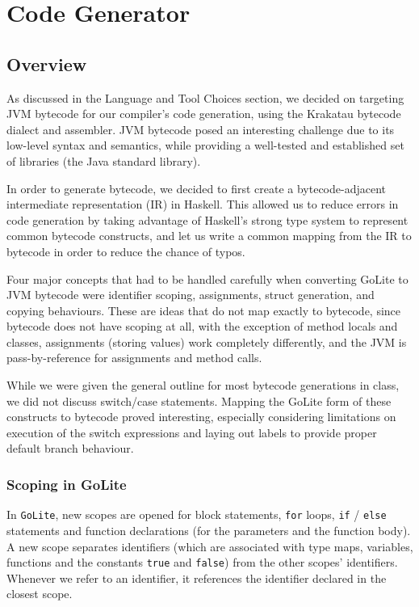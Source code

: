 \documentclass[11pt]{article}
\begin{document}
\section{Code Generator}
\subsection{Overview}

As discussed in the Language and Tool Choices section, we decided on targeting
JVM bytecode for our compiler's code generation, using the Krakatau bytecode
dialect and assembler. JVM bytecode posed an interesting challenge due to its
low-level syntax and semantics, while providing a well-tested and established
set of libraries (the Java standard library).

In order to generate bytecode, we decided to first create a bytecode-adjacent
intermediate representation (IR) in Haskell. This allowed us to reduce errors
in code generation by taking advantage of Haskell's strong type system to
represent common bytecode constructs, and let us write a common mapping from
the IR to bytecode in order to reduce the chance of typos.

Four major concepts that had to be handled carefully when converting GoLite to
JVM bytecode were identifier scoping, assignments, struct generation, and copying
behaviours. These are ideas that do not map exactly to bytecode, since bytecode
does not have scoping at all, with the exception of method locals and classes,
assignments (storing values) work completely differently, and the JVM is
pass-by-reference for assignments and method calls.

While we were given the general outline for most bytecode generations in class, we
did not discuss switch/case statements. Mapping the GoLite form of these constructs
to bytecode proved interesting, especially considering limitations on execution of
the switch expressions and laying out labels to provide proper default branch behaviour.

\subsubsection{Scoping in GoLite}
In \texttt{GoLite}, new scopes are opened for block statements,
\texttt{for} loops, \texttt{if} / \texttt{else} statements and
function declarations (for the parameters and the function body). A
new scope separates identifiers (which are associated with type maps,
variables, functions and the constants \texttt{true} and
\texttt{false}) from the other scopes' identifiers. Whenever we refer
to an identifier, it references the identifier declared in the closest
scope.
\end{document}
